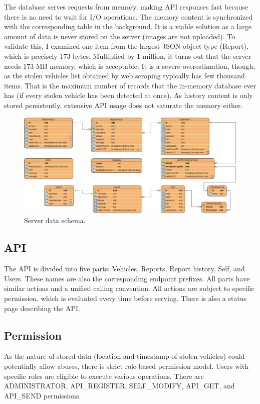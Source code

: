 The database serves requests from memory, making API responses fast because there is no need to wait for I/O operations. The memory content is synchronized with the corresponding table in the background. It is a viable solution as a large amount of data is never stored on the server (images are not uploaded). To validate this, I examined one item from the largest JSON object type (Report), which is precisely 173 bytes. Multiplied by 1 million, it turns out that the server needs 173 MB memory, which is acceptable. It is a severe overestimation, though, as the stolen vehicles list obtained by web scraping typically has few thousand items. That is the maximum number of records that the in-memory database ever has (if every stolen vehicle has been detected at once). As history content is only stored persistently, extensive API usage does not saturate the memory either.

\begin{figure}[htb]
 \centerline{\includegraphics[width=.85\columnwidth]{.//Figure/System/ServerData.PNG}}
 \caption{Server data schema.}
 \label{fig:simple}
\end{figure}

\subsection{API}

The API is divided into five parts: Vehicles, Reports, Report history, Self, and Users. These names are also the corresponding endpoint prefixes. All parts have similar actions and a unified calling convention. All actions are subject to specific permission, which is evaluated every time before serving. There is also a status page describing the API.

\subsection{Permission}

As the nature of stored data (location and timestamp of stolen vehicles) could potentially allow abuses, there is strict role-based permission model. Users with specific roles are eligible to execute various operations. There are ADMINISTRATOR, API\_REGISTER, SELF\_MODIFY, API\_GET, and API\_SEND permissions.

